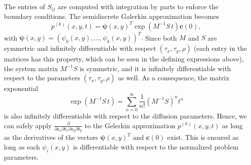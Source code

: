 The entries of $S_{ij}$ are computed with integration by parts to
enforce the boundary conditions. The semidiscrete Galerkin approximation
becomes
\[
  p^{(k)}(x,y,t) = \boldsymbol{\psi}(x,y)^T \exp\left( M^{-1}S\, t \right) \mathbf{c}(0),
\]
with $\boldsymbol{\psi}(x,y) = (\psi_0(x,y), \ldots, \psi_k(x,y))^T.$
Since both $M$ and $S$ are symmetric and infinitely differentiable
with respect $(\tau_x, \tau_y, \rho)$ (each entry in the matrices has
this property, which can be seen in the defining expressions above),
the system matrix $M^{-1}S$ is symmetric, and it is infinitely
differentiable with respect to the parameters $(\tau_x, \tau_y, \rho)$
as well. As a consequence, the matrix exponential
\[
  \exp\left( M^{-1}S\, t \right) = \sum_{n=0}^\infty \frac{1}{n!}
  \left(M^{-1}S\right)^n t^n
\]
is also infinitely differentiable with respect to the diffusion
parameters. Hence, we can safely apply
$\frac{\partial}{\partial a_x \partial b_x \partial a_y \partial b_y}$
to the Gelerkin approximation $p^{(k)}(x,y,t)$ as long as the
derivatives of the vectors $\boldsymbol{\psi}(x,y)^T$ and
$\mathbf{c}(0)$ exist. This is ensured as long as each $\psi_i(x,y)$
is differentiable with respect to the normalized problem parameters.



